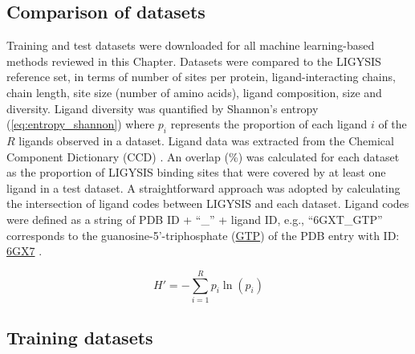 \subsection{Comparison of datasets}

Training and test datasets were downloaded for all machine learning-based methods reviewed in this Chapter. Datasets were compared to the LIGYSIS reference set, in terms of number of sites per protein, ligand-interacting chains, chain length, site size (number of amino acids), ligand composition, size and diversity. Ligand diversity was quantified by Shannon's entropy \cite{SHANNON_1948_ENTROPY} (\autoref{eq:entropy_shannon}) where $p_i$ represents the proportion of each ligand $i$ of the $R$ ligands observed in a dataset. Ligand data was extracted from the Chemical Component Dictionary (CCD) \cite{WESTBROOK_2015_CCD}. An overlap (\%) was calculated for each dataset as the proportion of LIGYSIS binding sites that were covered by at least one ligand in a test dataset. A straightforward approach was adopted by calculating the intersection of ligand codes between LIGYSIS and each dataset. Ligand codes were defined as a string of PDB ID + ``\_'' + ligand ID, e.g., ``6GXT\_GTP'' corresponds to the guanosine-5’-triphosphate (\href{https://www.ebi.ac.uk/pdbe-srv/pdbechem/chemicalCompound/show/GTP}{GTP}) of the PDB entry with ID: \href{https://www.ebi.ac.uk/pdbe/entry/pdb/6gx7}{6GX7} \cite{CAMPANACCI_2019_TUBULIN}.

\begin{equation}
H' = - \sum_{i=1}^{R} p_i \ln(p_i)
\label{eq:entropy_shannon}
\end{equation}

\subsection{Training datasets}

